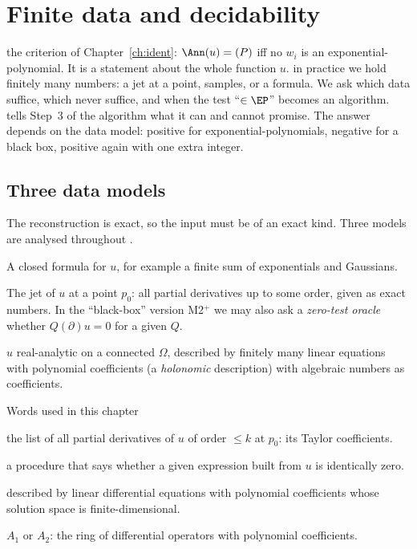 \chapter{Finite data and decidability}\label{ch:data}
\chapterbrief
{the criterion of Chapter~\ref{ch:ident}: $\Ann(u)=(P)$ iff no $w_i$ is an exponential-polynomial. It is a statement about the whole function $u$.}
{in practice we hold finitely many numbers: a jet at a point, samples, or a formula. We ask which data suffice, which never suffice, and when the test ``$\in\EP$'' becomes an algorithm.}
{tells Step~3 of the algorithm what it can and cannot promise. The answer depends on the data model: positive for exponential-polynomials, negative for a black box, positive again with one extra integer.}

\section{Three data models}

The reconstruction is exact, so the input must be of an exact kind. Three models are analysed throughout .

\begin{description}[leftmargin=1.4cm,labelwidth=1.1cm,font=\sffamily\bfseries]
\item[M1] A closed formula for $u$, for example a finite sum of exponentials and Gaussians.
\item[M2] The jet of $u$ at a point $p_0$: all partial derivatives up to some order, given as exact numbers. In the ``black-box'' version M2$^+$ we may also ask a \emph{zero-test oracle} whether $Q(\partial)u=0$ for a given $Q$.
\item[M3] $u$ real-analytic on a connected $\Omega$, described by finitely many linear equations with polynomial coefficients (a \emph{holonomic} description) with algebraic numbers as coefficients.
\end{description}

\begin{notebox}{Words used in this chapter}
\begin{description}[leftmargin=3.3cm,labelwidth=3.1cm]
\item[Jet of order $k$] the list of all partial derivatives of $u$ of order $\le k$ at $p_0$: its Taylor coefficients.
\item[Zero-test oracle] a procedure that says whether a given expression built from $u$ is identically zero.
\item[Holonomic] described by linear differential equations with polynomial coefficients whose solution space is finite-dimensional.
\item[Weyl algebra] $A_1$ or $A_2$: the ring of differential operators with polynomial coefficients.
\end{description}
\end{notebox}

